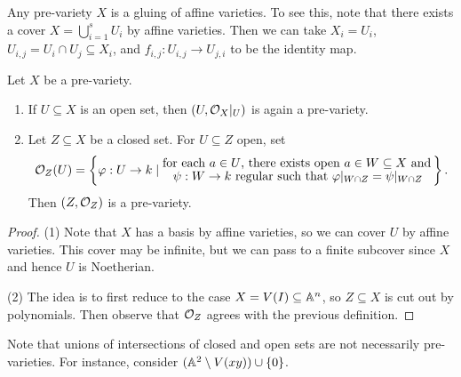 \begin{remark}
  Any pre-variety $X$ is a gluing of
  affine varieties.
  To see this, note that there exists a
  cover $X = \bigcup_{i = 1}^s U_i$
  by affine varieties. Then we can
  take $X_i = U_i$,
  $U_{i, j} = U_i \cap U_j \subseteq X_i$,
  and $f_{i, j} : U_{i, j} \to U_{j, i}$
  to be the identity map.
\end{remark}

\begin{prop}
  Let $X$ be a pre-variety.
  \begin{enumerate}
    \item If $U \subseteq X$ is an open
      set, then $(U, \mathcal{O}_X|_U)$ is again
      a pre-variety.
    \item Let $Z \subseteq X$ be a closed
      set. For $U \subseteq Z$ open, set
      \[
        \mathcal{O}_Z(U) = \left\{\varphi : U \to k 
          \mid
          \substack{\displaystyle\text{for each $a \in U$, there
          exists open $a \in W \subseteq X$
        and\,} \\ \displaystyle \text{$\psi : W \to k$ regular
      such that $\varphi|_{W \cap Z} = \psi|_{W \cap Z}$}
  }\right\}.
      \]
      Then $(Z, \mathcal{O}_Z)$ is a pre-variety.
  \end{enumerate}
\end{prop}

\begin{proof}
  (1) Note that $X$ has a basis by affine
  varieties, so we can cover $U$ by
  affine varieties. This cover may be
  infinite, but we can pass to a
  finite subcover since $X$ and hence
  $U$ is Noetherian.

  (2) The idea is to first reduce to the case
  $X = V(I) \subseteq \mathbb{A}^n$, so
  $Z \subseteq X$ is cut out by polynomials.
  Then observe that $\mathcal{O}_Z$ agrees with
  the previous definition.
\end{proof}

\begin{remark}
  Note that unions of intersections
  of closed and open sets are not
  necessarily pre-varieties.
  For instance, consider
  $(\mathbb{A}^2 \setminus V(xy)) \cup \{0\}$.
\end{remark}


